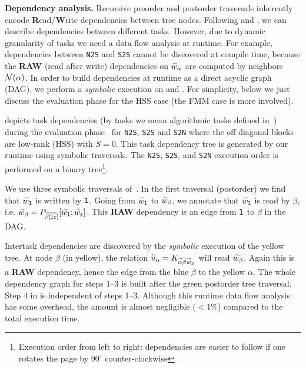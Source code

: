 \textbf{Dependency analysis.}
Recursive preorder and postorder traversals 
inherently encode \textbf{R}ead/\textbf{W}rite dependencies 
between tree nodes. Following  and , we can describe dependencies between different tasks. However, due to dynamic granularity of tasks we need a data flow 
analysis at runtime.  For example, dependencies between \texttt{N2S} and \texttt{S2S} 
cannot be discovered at compile time, because the \textbf{RAW}
(read after write) dependencies on ${\widetilde{w}}_{\alpha}$ are computed by neighbors
${\mathcal N}(\alpha)$. In order to build dependencies at runtime as a direct acyclic graph (DAG), 
we perform a \emph{symbolic} execution on  
and . For simplicity, below we just discuss the evaluation phase for the HSS case 
(the FMM case is more involved).

 depicts task dependencies (by tasks we mean algorithmic
tasks defined in~) during the evaluation
phase~ for \texttt{N2S}, \texttt{S2S} and \texttt{S2N} where
the off-diagonal blocks are  low-rank (HSS) with $S=0$. This task dependency
tree is generated by our runtime using symbolic traversals. The \texttt{N2S},
\texttt{S2S}, and \texttt{S2N} execution order is performed on a binary
tree\footnote{\scriptsize Execution order from left to right: dependencies are
easier to follow if one rotates the page by $90^{\circ}$ counter-clockwise}.

We use three symbolic traversals of~. In the first traversal (postorder) we
find that  ${\widetilde{w}}_{{\tt l}}$ is written by ${\tt l}$. Going from ${\widetilde{w}}_{{\tt l}}$ to
${\widetilde{w}}_\beta$, we annotate that ${\widetilde{w}}_{{\tt l}}$ is read by $\beta$, i.e.
${\widetilde{w}}_{\beta}= P_{{\widetilde{\beta}}[{\widetilde{{\tt l}}}{\widetilde{{\tt r}}}]}[{\widetilde{w}}_{{\tt l}};{\widetilde{w}}_{{\tt r}}]$.
This \textbf{RAW} dependency is an edge from ${\tt l}$ to $\beta$ in the DAG.

Intertask dependencies are discovered by  the \emph{symbolic}
execution of the yellow tree. At node $\beta$ (in yellow), the relation
${\widetilde{u}}_{\alpha}=K_{{\widetilde{\alpha}}{\widetilde{\beta}}{\widetilde{w}}_{\beta}}$
will read ${\widetilde{w_{\beta}}}$. Again this is a \textbf{RAW} dependency, hence the edge from the blue $\beta$ to the yellow $\alpha$. The whole dependency graph for steps 1--3 is built after the green postorder tree traversal. Step 4 in  is independent of steps 1--3. Although this runtime data flow analysis has some overhead, the amount is almost negligible ($<1\%$) compared to the total execution time.  

